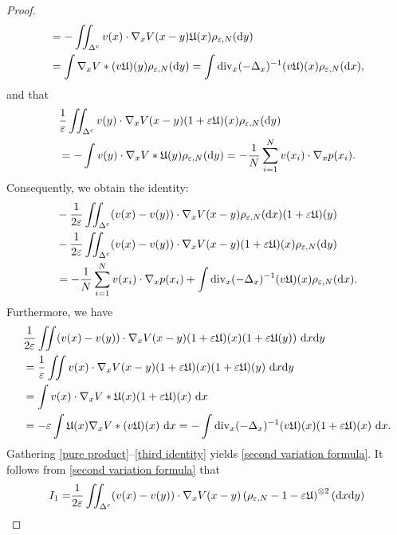 \documentclass[11pt,reqno]{amsart}
\numberwithin{equation}{section}
\def\dd{{\rm d}}
\begin{document}
\begin{proof}
\begin{align*}
&=-\iint_{\Delta^{c}}v(x)\cdot \nabla_{x}V(x-y)\mathfrak{U}(x)\rho_{\varepsilon,N}(\dd y)\\
&=\int \nabla_{x} V\ast (v\mathfrak{U})(y)\rho_{\varepsilon,N}(\dd y)=\int \mathrm{div}_{x}(-\Delta_{x})^{-1}(v\mathfrak{U})(x)\rho_{\varepsilon,N}(\dd x),  
\end{align*}
and that 
\begin{align*}
&\frac{1}{\varepsilon}\iint_{\Delta^{c}} v(y)\cdot \nabla_{x}V(x-y)(1+\varepsilon \mathfrak{U})(x)\rho_{\varepsilon,N}(\dd y)\\
&=-\int v(y)\cdot \nabla_{x} V\ast \mathfrak{U}(y)\rho_{\varepsilon,N}(\dd y)
=-\frac{1}{N}\sum_{i=1}^{N}v(x_{i})\cdot \nabla_{x}p(x_{i}).    
\end{align*}
Consequently, we obtain the identity:  
\begin{align}
&-\frac{1}{2\varepsilon}\iint_{\Delta^{c}}(v(x)-v(y))\cdot \nabla_{x}V(x-y)\rho_{\varepsilon,N}(\dd x)(1+\varepsilon \mathfrak{U})( y) \notag\\
&-\frac{1}{2\varepsilon}\iint_{\Delta^{c}}(v(x)-v(y))\cdot \nabla_{x}V(x-y)(1+\varepsilon\mathfrak{U})(x)\rho_{\varepsilon,N}(\dd y)\notag\\
&=-\frac{1}{N}\sum_{i=1}^{N}v(x_{i})\cdot \nabla_{x}p(x_{i})+\int \mathrm{div}_{x}(-\Delta_{x})^{-1}(v\mathfrak{U})(x)\rho_{\varepsilon,N}(\dd x).  \label{sec identity}   
\end{align}
Furthermore, we have
\begin{align}
&\frac{1}{2\varepsilon}\iint(v(x)-v(y))\cdot \nabla_{x}V(x-y)(1+\varepsilon \mathfrak{U})(x)(1+\varepsilon\mathfrak{U}(y))\ \dd x\dd y \notag\\
&=\frac{1}{\varepsilon}\iint v(x)\cdot \nabla_{x}V(x-y)(1+\varepsilon \mathfrak{U})(x)(1+\varepsilon\mathfrak{U})(y)\ \dd x\dd y \notag\\
&=\int v(x)\cdot \nabla_{x} V\ast \mathfrak{U}(x)(1+\varepsilon \mathfrak{U})(x)\ \dd x \notag\\
&=-\varepsilon\int \mathfrak{  U}(x)\nabla_{x}V\ast (v\mathfrak{U})(x)\ \dd x=-\int \mathrm{div}_{x}(-\Delta_{x})^
{-1}(v\mathfrak{U})(x)(1+\varepsilon \mathfrak{U})(x)\ \dd x. \label{third identity}
\end{align}
Gathering \eqref{pure product}--\eqref{third identity} 
yields \eqref{second variation formula}. It follows from \eqref{second variation formula} that 
\begin{align}
I_{1}=&  \frac{1}{2\varepsilon}\iint_{\Delta^{c}}(v(x)-v(y))\cdot \nabla_{x} V(x-y)\left(\rho_{\varepsilon,N}-1-\varepsilon \mathfrak{U}\right)^{\otimes 2}(\dd x\dd y) \notag\\

\end{align}
\end{proof}
\end{document}
